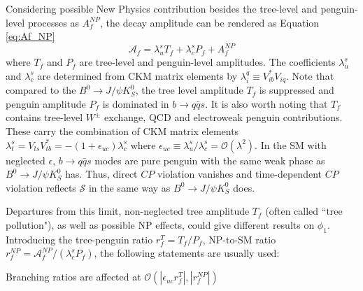 \begin{comment}
First,  the $b\to q\bar{q}s$  gives a different vertex in gluonic decay than tree diagram. 
Second, such process is tree level suppressed but penguin-dominated, so the New Physics effects can be easier to be spotted. The SM agrees with tree level process in percent accuracy so the sub-percent BSM effects may be hard to see. Similar to Fig(1-7), due to FCNC tree level forbidden, 
\begin{figure}[H]
\centering
\texttt{[image: Bto3Ks]}
\caption{penguin mode $b\to q\bar{q}s$ where $\phi$ is formed by two strange quark as the intermediate state.}
\end{figure}

\end{comment}
Considering possible New Physics contribution besides the tree-level and penguin-level processes as $A_f^{NP}$, the decay amplitude can be rendered as Equation \ref{eq:Af_NP} 
\begin{equation}\label{eq:Af_NP}
\mathcal{A}_f= 
\lambda^s_u T_f + 
\lambda^s_c P_f +
{A}_f^{NP} 
\end{equation}
where $T_f$ and $P_f$ are tree-level and penguin-level amplitudes. The coefficients $\lambda^s_u$ and $\lambda^s_c$  are determined from CKM matrix elements by $\lambda^q_i \equiv V^*_{ib}V_{iq}$. Note that compared to the $B^0 \to J/\psi K^0_S$,
the tree level amplitude $T_f$ is suppressed and penguin amplitude $P_f$ is dominated in $b\to q\bar{q}s$. It is also worth noting that $T_f$ contains tree-level $W^{\pm}$ exchange, QCD and electroweak penguin contributions. These carry the combination of CKM matrix elements $\lambda_t^s = V_{ts}V^*_{tb}=-(1+\epsilon_{uc})\lambda^s_c$ where $\epsilon_{uc} \equiv \lambda^s_u / \lambda^s_c = \mathcal{O}(\lambda^2)$. In the SM with neglected $\epsilon$,  $b\to q\bar{q}s$ modes are pure penguin with the same weak phase as $B^0 \to J/\psi K^0_S$ has. Thus, direct $CP$ violation vanishes and time-dependent $CP$ violation reflects $\mathcal{S}$ in the same way as $B^0 \to J/\psi K^0_S$ does. 

Departures from this limit, non-neglected tree amplitude $T_f$ (often called ``tree pollution"), as well as possible NP effects, could give different results on $\phi_1$. Introducing the tree-penguin ratio $r^T_f = T_f / P_f$, NP-to-SM ratio $r^{NP}_f = \mathcal{A}^{NP}_f / (\lambda^s_c P_f)$, the following statements are usually used\cite{b2book}:

\textbullet \space Branching ratios are affected at $\mathcal{O}(|\epsilon_{uc}r^T_f|,|r^{NP}_f|)$

